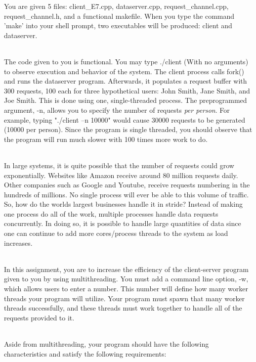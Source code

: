 \documentclass[12pt]{extarticle}
\newenvironment{myindentpar}[1]%
 {\begin{list}{}%
         {\setlength{\leftmargin}{#1}}%
         \item[]%
 }
 {\end{list}}
\begin{document}
\begin{myindentpar}{5mm}

	You are given 5 files: client\_E7.cpp, dataserver.cpp, request\_channel.cpp, request\_channel.h, and a functional makefile. When you type the command 'make' into your shell prompt, two executables will be produced: client and dataserver.  
	
	\ \\
	The code given to you is functional.  You may type ./client (With no arguments) to observe execution and behavior of the system. The client process calls fork() and runs the dataserver program.  Afterwards, it populates a request buffer with 300 requests, 100 each for three hypothetical users: John Smith, Jane Smith, and Joe Smith. This is done using one, single-threaded process.  The preprogrammed argument, -n, allows you to specify the number of requests \emph{per person}.  For example, typing "./client –n 10000" would cause 30000 requests to be generated (10000 per person).  Since the program is single threaded, you should observe that the program will run much slower with 100 times more work to do.  
	
	\ \\
	In large systems, it is quite possible that the number of requests could grow exponentially.  Websites like Amazon receive around 80 million requests daily.  Other companies such as Google and Youtube, receive requests numbering in the hundreds of millions.  No single process will ever be able to this volume of traffic.  So, how do the worlds largest businesses handle it in stride?  Instead of making one process do all of the work, multiple processes handle data requests concurrently.  In doing so, it is possible to handle large quantities of data since one can continue to add more cores/process threads to the system as load increases.  
	
	\ \\
	In this assignment, you are to increase the efficiency of the client-server program given to you by using multithreading.  You must add a command line option, -w, which allows users to enter a number.  This number will define how many worker threads your program will utilize.  Your program must spawn that many worker threads successfully, and these threads must work together to handle all of the requests provided to it.  
	
	\ \\
	Aside from multithreading, your program should have the following characteristics and satisfy the following requirements:
	\begin{itemize}
	    \setlength\itemsep{-0.1em}
	    

\end{itemize}
\end{myindentpar}
\end{document}
